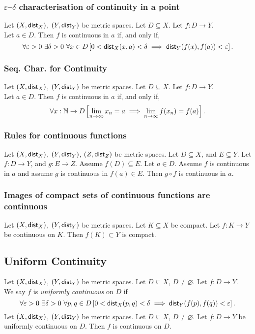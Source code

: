 \subsubsection*{$\varepsilon$--$\delta$ characterisation of continuity in a point}
\uthm Let $(X, \mathsf{dist}_X)$, $(Y, \mathsf{dist}_Y)$ be metric spaces.
Let $D \subseteq X$. Let $f : D \to Y$.\\
Let $a \in D$. Then $f$ is continuous in $a$ if, and only if,
\[
    \forall \varepsilon > 0\ \exists \delta > 0\ \forall x \in D
        \left[ 0 < \mathsf{dist}_X(x,a) < \delta \implies \mathsf{dist}_Y(f(x), f(a)) < \varepsilon \right].
\]

\subsubsection*{Seq. Char. for Continuity}
\uthm Let $(X, \mathsf{dist}_X)$, $(Y, \mathsf{dist}_Y)$ be metric spaces.
Let $D \subseteq X$. Let $f : D \to Y$.\\
Let $a \in D$. Then $f$ is continuous in $a$ if, and only if,
\[
    \forall x : \mathbb{N} \to D \left[ \lim_{n \to \infty} x_n = a
        \implies \lim_{n \to \infty} f(x_n) = f(a) \right].
\]

\subsubsection*{Rules for continuous functions}
\uthm Let $(X, \mathsf{dist}_X)$, $(Y, \mathsf{dist}_Y)$, $(Z, \mathsf{dist}_Z)$ be metric spaces.
Let $D \subseteq X$, and $E \subseteq Y$. Let $f : D \to Y$, and $g : E \to Z$.
Assume $f(D) \subseteq E$. Let $a \in D$. Assume $f$ is continuous in $a$ and
assume $g$ is continuous in $f(a) \in E$.
Then $g \circ f$ is continuous in $a$.

\subsubsection*{Images of compact sets of continuous functions are continuous}
\uthm Let $(X, \mathsf{dist}_X)$, $(Y, \mathsf{dist}_Y)$ be metric spaces.
Let $K \subseteq X$ be compact. Let $f : K \to Y$ be continuous on $K$.
Then $f(K) \subset Y$ is compact.

\subsection{Uniform Continuity}
\udef Let $(X, \mathsf{dist}_X)$, $(Y, \mathsf{dist}_Y)$ be metric spaces.
Let $D \subseteq X$, $D \neq \varnothing$. Let $f : D \to Y$.\\
We say $f$ is \emph{uniformly continuous} on $D$ if
\[
    \forall \varepsilon > 0\ \exists \delta > 0\ \forall p,q \in D
        \left[ 0 < \mathsf{dist}_X(p,q) < \delta \implies \mathsf{dist}_Y(f(p), f(q)) < \varepsilon \right].
\]
\uprop Let $(X, \mathsf{dist}_X)$, $(Y, \mathsf{dist}_Y)$ be metric spaces.
Let $D \subseteq X$, $D \neq \varnothing$. Let $f : D \to Y$ be uniformly
continuous on $D$. Then $f$ is continuous on $D$.
